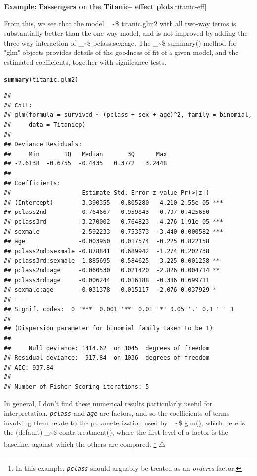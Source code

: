 \documentclass{article}
\makeatletter
\newcommand{\hlstd}[1]{\textcolor[rgb]{0.345,0.345,0.345}{#1}}%
\newcommand{\hlkwd}[1]{\textcolor[rgb]{0.737,0.353,0.396}{\textbf{#1}}}%
\newenvironment{kframe}{%
 \def\at@end@of@kframe{}%
 \ifinner\ifhmode%
  \def\at@end@of@kframe{\end{minipage}}%
  \begin{minipage}{\columnwidth}%
 \fi\fi%
 \def\FrameCommand##1{\hskip\@totalleftmargin \hskip-\fboxsep
 \colorbox{shadecolor}{##1}\hskip-\fboxsep
     \hskip-\linewidth \hskip-\@totalleftmargin \hskip\columnwidth}%
 \MakeFramed {\advance\hsize-\width
   \@totalleftmargin\z@ \linewidth\hsize
   \@setminipage}}%
 {\par\unskip\endMakeFramed%
 \at@end@of@kframe}
\newenvironment{knitrout}{}{} %
\newcommand{\var}[1]{\textit{\texttt{#1}}}
\newcommand{\class}[1]{\textsf{"#1"}}
\newcommand\code{\bgroup\@makeother\_\@makeother\~\@makeother\$\@codex}
\def\@codex#1{{\normalfont\ttfamily\hyphenchar\font=-1 #1}\egroup}
\newcommand{\func}[1]{\code{#1()}}
\newenvironment{Example}[2][unnamed-example]%
  {\medskip\noindent\textbf{\textsf{Example:}}
   \textbf{#2}\hfill [#1]\par\smallskip
  }
  {\hfill $\triangle$}
\makeatother
\begin{document}
\begin{Example}[titanic-eff]{Passengers on the Titanic-- effect plots}
From this, we see that the model \code{titanic.glm2} with all two-way terms is
substantially better than the one-way model, and is not improved by adding the
three-way interaction of \code{pclass:sex:age}.  The \func{summary} method for
\class{glm} objects provides details of the goodness of fit of a given model,
and the estimated coefficients, together with signifcance tests.
\begin{knitrout}
\color{fgcolor}\begin{kframe}
\begin{alltt}
\hlkwd{summary}\hlstd{(titanic.glm2)}
\end{alltt}
\begin{verbatim}
## 
## Call:
## glm(formula = survived ~ (pclass + sex + age)^2, family = binomial, 
##     data = Titanicp)
## 
## Deviance Residuals: 
##     Min       1Q   Median       3Q      Max  
## -2.6138  -0.6755  -0.4435   0.3772   3.2448  
## 
## Coefficients:
##                    Estimate Std. Error z value Pr(>|z|)    
## (Intercept)        3.390355   0.805280   4.210 2.55e-05 ***
## pclass2nd          0.764667   0.959843   0.797 0.425650    
## pclass3rd         -3.270002   0.764823  -4.276 1.91e-05 ***
## sexmale           -2.592233   0.753573  -3.440 0.000582 ***
## age               -0.003950   0.017574  -0.225 0.822158    
## pclass2nd:sexmale -0.878841   0.689942  -1.274 0.202738    
## pclass3rd:sexmale  1.885695   0.584625   3.225 0.001258 ** 
## pclass2nd:age     -0.060530   0.021420  -2.826 0.004714 ** 
## pclass3rd:age     -0.006244   0.016188  -0.386 0.699711    
## sexmale:age       -0.031378   0.015117  -2.076 0.037929 *  
## ---
## Signif. codes:  0 '***' 0.001 '**' 0.01 '*' 0.05 '.' 0.1 ' ' 1
## 
## (Dispersion parameter for binomial family taken to be 1)
## 
##     Null deviance: 1414.62  on 1045  degrees of freedom
## Residual deviance:  917.84  on 1036  degrees of freedom
## AIC: 937.84
## 
## Number of Fisher Scoring iterations: 5
\end{verbatim}
\end{kframe}
\end{knitrout}
In general, I don't find these numerical results particularly useful for interpretation.
\var{pclass} and \var{age} are factors, and so the coefficients of
terms involving them relate to the parameterization used by \func{glm}, 
which here is the (default) \func{contr.treatment}, where the first level of a factor
is the baseline, against which the others are compared.%
\footnote{
In this example, \var{pclass} should arguably be treated as an \emph{ordered} factor,
}
\end{Example}
\end{document}

